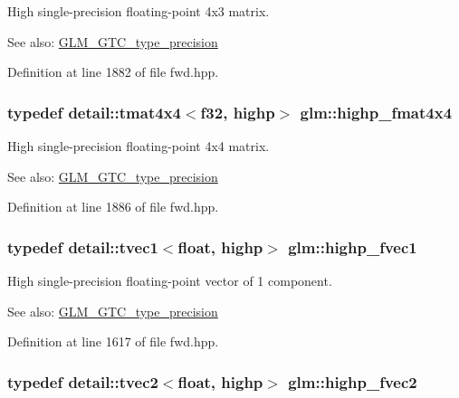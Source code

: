 High single-precision floating-point 4x3 matrix. \begin{Desc}
\item[See also:]\hyperlink{group__gtc__type__precision}{GLM\_\-GTC\_\-type\_\-precision} \end{Desc}


Definition at line 1882 of file fwd.hpp.\hypertarget{group__gtc__type__precision_gf0a98d6caffce89da963d3430e05ddb0}{
\subsubsection[highp\_\-fmat4x4]{\setlength{\rightskip}{0pt plus 5cm}typedef detail::tmat4x4$<$f32, highp$>$ {\bf glm::highp\_\-fmat4x4}}}
\label{group__gtc__type__precision_gf0a98d6caffce89da963d3430e05ddb0}


High single-precision floating-point 4x4 matrix. \begin{Desc}
\item[See also:]\hyperlink{group__gtc__type__precision}{GLM\_\-GTC\_\-type\_\-precision} \end{Desc}


Definition at line 1886 of file fwd.hpp.\hypertarget{group__gtc__type__precision_g5d9f2208253856df60a57925f92ff0c8}{
\subsubsection[highp\_\-fvec1]{\setlength{\rightskip}{0pt plus 5cm}typedef detail::tvec1$<$float, highp$>$ {\bf glm::highp\_\-fvec1}}}
\label{group__gtc__type__precision_g5d9f2208253856df60a57925f92ff0c8}


High single-precision floating-point vector of 1 component. \begin{Desc}
\item[See also:]\hyperlink{group__gtc__type__precision}{GLM\_\-GTC\_\-type\_\-precision} \end{Desc}


Definition at line 1617 of file fwd.hpp.\hypertarget{group__gtc__type__precision_gb58ecc53699d45f4f88d67bbff084c54}{
\subsubsection[highp\_\-fvec2]{\setlength{\rightskip}{0pt plus 5cm}typedef detail::tvec2$<$float, highp$>$ {\bf glm::highp\_\-fvec2}}}
\label{group__gtc__type__precision_gb58ecc53699d45f4f88d67bbff084c54}


